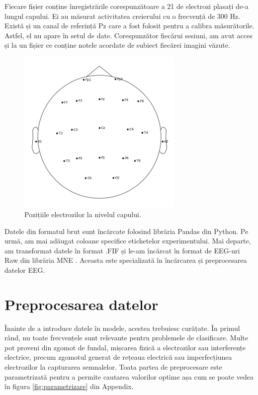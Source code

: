 Fiecare fișier conține înregistrările corespunzătoare a 21 de electrozi plasați de-a lungul capului. 
Ei au măsurat activitatea creierului cu o frecvență de 300 Hz. 
Există și un canal de referință Pz care a fost folosit pentru a calibra măsurătorile. 
Astfel, el nu apare în setul de date. 
Corespunzător fiecărui sesiuni, am avut acces și la un fișier ce conține notele acordate de subiect fiecărei imagini văzute. 

\begin{figure}[H]
    \centering
		\vspace{-1em}
    \includegraphics[width=8cm]{images/Sensor_positions_(eeg).png}
    \caption{Pozițiile electrozilor la nivelul capului.}
		\vspace{-1em}
    \label{fig:sensor_positions}
\end{figure}
Datele din formatul brut sunt încărcate folosind librăria Pandas \cite{reback2020pandas} din Python. Pe urmă, am mai adăugat coloane specifice etichetelor experimentului. Mai departe, am transformat datele în format .FIF și le-am încărcat în format de EEG-uri Raw din librăria MNE \cite{MNE}. Aceasta este specializată în încărcarea și preprocesarea datelor EEG.

\section{Preprocesarea datelor}
Înainte de a introduce datele în modele, acestea trebuiesc curățate. În primul rând, nu toate frecvențele sunt relevante pentru problemele de clasificare. Multe pot proveni din zgomot de fundal, mișcarea fizică a electrozilor sau interferențe electrice, precum zgomotul generat de rețeaua electrică sau imperfecțiunea electrozilor la capturarea semnalelor. Toata partea de preprocesare este parametrizată pentru a permite cautarea valorilor optime așa cum se poate vedea în figura \ref{fig:parametrizare} din Appendix.

